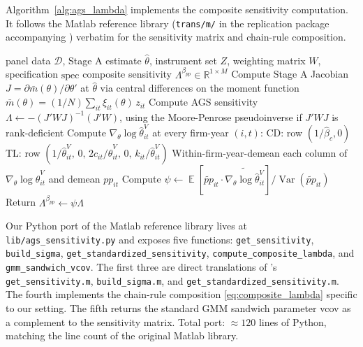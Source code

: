 \documentclass[11pt]{article}
\DeclareMathOperator{\E}{\mathbb{E}}
\DeclareMathOperator{\Var}{Var}
\begin{document}
Algorithm~\ref{alg:ags_lambda} implements the composite sensitivity computation. It follows the Matlab reference library (\texttt{trans/m/} in the replication package accompanying \citealt{AGS2017}) verbatim for the sensitivity matrix and chain-rule composition.

\begin{algorithm}[htbp]
\caption{Composite AGS sensitivity $\Lambda^{\beta_{pp}}$ for the procurement premium}\label{alg:ags_lambda}
\begin{algorithmic}[1]
\INPUT panel data $\mathcal{D}$, Stage A estimate $\hat\theta$, instrument set $Z$, weighting matrix $W$, specification $\text{spec}$
\OUTPUT composite sensitivity $\Lambda^{\beta_{pp}} \in \mathbb{R}^{1\times M}$
\State Compute Stage A Jacobian $J = \partial\bar m(\theta)/\partial\theta'$ at $\hat\theta$ via central differences on the moment function $\bar m(\theta) = (1/N)\sum_{it}\xi_{it}(\theta)\,z_{it}$
\State Compute AGS sensitivity $\Lambda \gets -(J'WJ)^{-1}(J'W)$, using the Moore-Penrose pseudoinverse if $J'WJ$ is rank-deficient
\State Compute $\nabla_\theta \log\hat\theta^V_{it}$ at every firm-year $(i,t)$:
\Statex \hspace{\algorithmicindent} CD: row $(1/\hat\beta_c, 0)$
\Statex \hspace{\algorithmicindent} TL: row $(1/\hat\theta^V_{it},\, 0,\, 2c_{it}/\hat\theta^V_{it},\, 0,\, k_{it}/\hat\theta^V_{it})$
\State Within-firm-year-demean each column of $\nabla_\theta \log\hat\theta^V_{it}$ and demean $pp_{it}$
\State Compute $\psi \gets \E[\widetilde{pp}_{it}\cdot\widetilde{\nabla_\theta\log\hat\theta^V_{it}}]/\Var(\widetilde{pp}_{it})$ 
\State Return $\Lambda^{\beta_{pp}} \gets \psi \Lambda$
\end{algorithmic}
\end{algorithm}

Our Python port of the Matlab reference library lives at \texttt{lib/ags\_sensitivity.py} and exposes five functions: \texttt{get\_sensitivity}, \texttt{build\_sigma}, \texttt{get\_standardized\_sensitivity}, \texttt{compute\_composite\_lambda}, and \texttt{gmm\_sandwich\_vcov}. The first three are direct translations of \citet{AGS2017}'s \texttt{get\_sensitivity.m}, \texttt{build\_sigma.m}, and \texttt{get\_standardized\_sensitivity.m}. The fourth implements the chain-rule composition \eqref{eq:composite_lambda} specific to our setting. The fifth returns the standard GMM sandwich parameter vcov as a complement to the sensitivity matrix. Total port: $\approx 120$ lines of Python, matching the line count of the original Matlab library.
\end{document}
